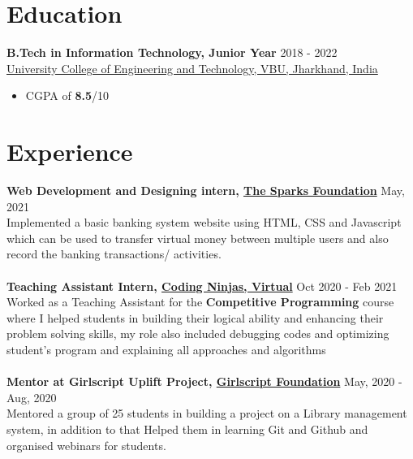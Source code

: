 \documentclass[margin, centered]{res}
\begin{document}
\begin{resume}

\section{Education}
\textbf{B.Tech in Information Technology, Junior Year} \hfill 2018 - 2022 \\
\href{http://ucetvbu.ac.in/}{University College of Engineering and Technology, VBU, Jharkhand, India}
\begin{itemize}
 \item CGPA of \textbf{8.5}/10
\end{itemize}

\section{Experience}
\textbf{Web Development and Designing intern, \href{https://www.thesparksfoundationsingapore.org/}{The Sparks Foundation}} \hfill May, 2021\\
Implemented a basic banking system website using HTML, CSS and Javascript which can be used to transfer virtual money between multiple users and also record the banking transactions/ activities.\\
\\
\textbf{Teaching Assistant Intern, \href{https://www.codingninjas.com/}{Coding Ninjas, Virtual}} \hfill Oct 2020 - Feb 2021 \\
Worked as a Teaching Assistant for the \textbf{Competitive Programming} course where I helped students in building their logical ability and enhancing their problem solving skills, my role also included debugging codes and optimizing student's program and explaining all approaches and algorithms\\
\\
\textbf{Mentor at Girlscript Uplift Project, \href{https://www.girlscript.tech/home}{Girlscript Foundation}} \hfill May, 2020 - Aug, 2020 \\
Mentored a group of 25 students in building a project on a Library management system, in addition to that Helped them in learning Git and Github and organised webinars for students.

\end{resume}
\end{document}
